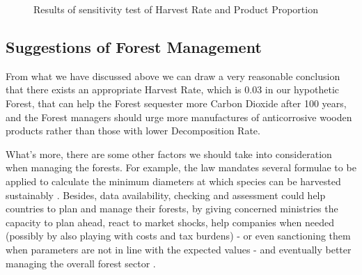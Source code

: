 \documentclass{mcmthesis}
\numberwithin{figure}{section}
\numberwithin{table}{section}
\numberwithin{equation}{section}
\begin{document}
\begin{figure}[htbp]
  \centering

\caption{Results of sensitivity test of Harvest Rate and Product Proportion}
\end{figure}

\subsection{Suggestions of Forest Management}
From what we have discussed above we can draw a very reasonable conclusion that 
there exists an appropriate Harvest Rate, which is 0.03 in our hypothetic Forest, 
that can help the Forest sequester more Carbon Dioxide after 100 years, and
the Forest managers should urge more manufactures of anticorrosive wooden products
rather than those with lower Decomposition Rate. 
\par
What's more, there are some other factors we should take into consideration when 
managing the forests. For example, the law mandates several formulae to be applied 
to calculate the minimum diameters at which species can be harvested 
sustainably \citep{lumet1993etude}. Besides, data availability, checking and 
assessment could help countries to plan and manage their forests, by giving 
concerned ministries the capacity to plan ahead, react to market shocks, help
companies when needed (possibly by also playing with costs and
tax burdens) - or even sanctioning them when parameters are not
in line with the expected values - and eventually better managing
the overall forest sector \citep{2017Cerutti}.
\end{document}
